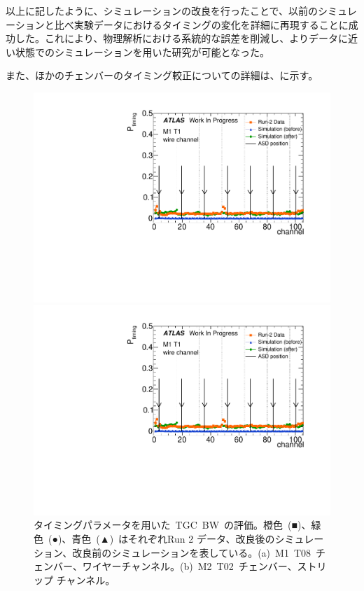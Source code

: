 以上に記したように、シミュレーションの改良を行ったことで、以前のシミュレーションと比べ実験データにおけるタイミングの変化を詳細に再現することに成功した。これにより、物理解析における系統的な誤差を削減し、よりデータに近い状態でのシミュレーションを用いた研究が可能となった。

また、ほかのチェンバーのタイミング較正についての詳細は、に示す。

\begin{figure}[tbp]
	\begin{minipage}{0.49\hsize}
	\centering
	\includegraphics[width=\textwidth,page=10]{img/pdf5/master_timingplot_comp.pdf}
	\subcaption{}
	\end{minipage}
	\begin{minipage}{0.49\hsize}
	\centering
	\includegraphics[width=\textwidth,page=13]{img/pdf5/master_timingplot_comp.pdf}
	\subcaption{}
	\end{minipage}
	\caption[タイミングパラメータを用いた~TGC~BW~の評価]{タイミングパラメータを用いた~TGC~BW~の評価。橙色~(■)、緑色~(●)、青色~(▲)~はそれぞれRun 2 データ、改良後のシミュレーション、改良前のシミュレーションを表している。(a)~M1~T08~チェンバー、ワイヤーチャンネル。(b)~M2~T02~チェンバー、ストリップ チャンネル。}
	\label{fig:timingPlotBW}
\end{figure}


